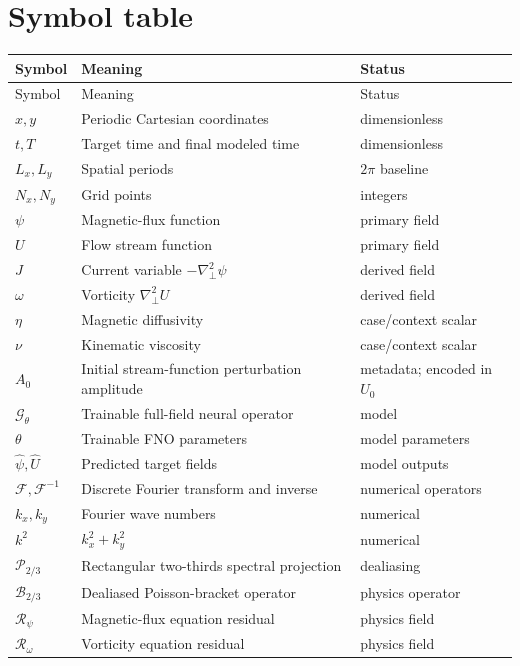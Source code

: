 \documentclass[11pt]{article}
\newcommand{\Lap}{\nabla_\perp^2}
\newcommand{\Rpsi}{\mathcal{R}_{\psi}}
\newcommand{\Romega}{\mathcal{R}_{\omega}}
\newcommand{\FFT}{\mathcal{F}}
\newcommand{\IFFT}{\mathcal{F}^{-1}}
\newcommand{\Ptwo}{\mathcal{P}_{2/3}}
\begin{document}
\section{Symbol table}
\label{app:symbols}

\small
\begin{longtable}{p{}p{}p{}}
\toprule
Symbol & Meaning & Status \\
\midrule
\endfirsthead
\toprule
Symbol & Meaning & Status \\
\midrule
\endhead
$x,y$ & Periodic Cartesian coordinates & dimensionless \\
$t,T$ & Target time and final modeled time & dimensionless \\
$L_x,L_y$ & Spatial periods & $2\pi$ baseline \\
$N_x,N_y$ & Grid points & integers \\
$\psi$ & Magnetic-flux function & primary field \\
$U$ & Flow stream function & primary field \\
$J$ & Current variable $-\Lap\psi$ & derived field \\
$\omega$ & Vorticity $\Lap U$ & derived field \\
$\eta$ & Magnetic diffusivity & case/context scalar \\
$\nu$ & Kinematic viscosity & case/context scalar \\
$A_0$ & Initial stream-function perturbation amplitude & metadata; encoded in $U_0$ \\
$\mathcal{G}_\theta$ & Trainable full-field neural operator & model \\
$\theta$ & Trainable FNO parameters & model parameters \\
$\widehat\psi,\widehat U$ & Predicted target fields & model outputs \\
$\FFT,\IFFT$ & Discrete Fourier transform and inverse & numerical operators \\
$k_x,k_y$ & Fourier wave numbers & numerical \\
$k^2$ & $k_x^2+k_y^2$ & numerical \\
$\Ptwo$ & Rectangular two-thirds spectral projection & dealiasing \\
$\mathcal{B}_{2/3}$ & Dealiased Poisson-bracket operator & physics operator \\
$\Rpsi$ & Magnetic-flux equation residual & physics field \\
$\Romega$ & Vorticity equation residual & physics field \\

\end{longtable}
\end{document}
